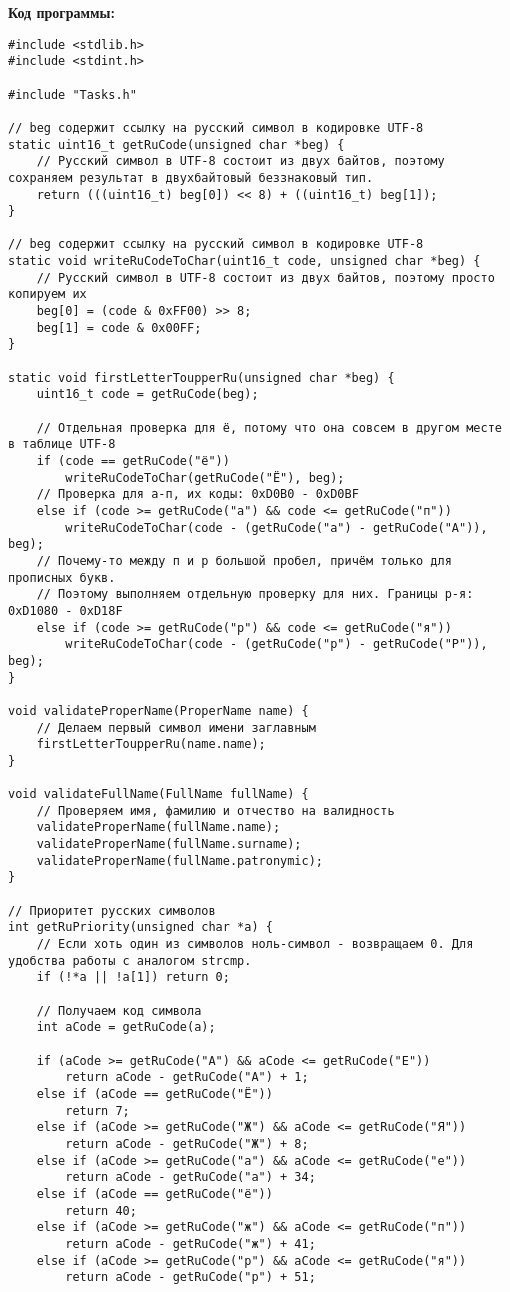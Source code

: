\documentclass[a4paper, 12pt, oneside]{article}
\begin{document}
    \textbf{Код программы:}\\
    \begin{verbatim}
#include <stdlib.h>
#include <stdint.h>

#include "Tasks.h"

// beg содержит ссылку на русский символ в кодировке UTF-8
static uint16_t getRuCode(unsigned char *beg) {
    // Русский символ в UTF-8 состоит из двух байтов, поэтому сохраняем результат в двухбайтовый беззнаковый тип.
    return (((uint16_t) beg[0]) << 8) + ((uint16_t) beg[1]);
}

// beg содержит ссылку на русский символ в кодировке UTF-8
static void writeRuCodeToChar(uint16_t code, unsigned char *beg) {
    // Русский символ в UTF-8 состоит из двух байтов, поэтому просто копируем их
    beg[0] = (code & 0xFF00) >> 8;
    beg[1] = code & 0x00FF;
}

static void firstLetterToupperRu(unsigned char *beg) {
    uint16_t code = getRuCode(beg);

    // Отдельная проверка для ё, потому что она совсем в другом месте в таблице UTF-8
    if (code == getRuCode("ё"))
        writeRuCodeToChar(getRuCode("Ë"), beg);
    // Проверка для а-п, их коды: 0xD0B0 - 0xD0BF
    else if (code >= getRuCode("а") && code <= getRuCode("п"))
        writeRuCodeToChar(code - (getRuCode("а") - getRuCode("А")), beg);
    // Почему-то между п и р большой пробел, причём только для прописных букв.
    // Поэтому выполняем отдельную проверку для них. Границы р-я: 0xD1080 - 0xD18F
    else if (code >= getRuCode("р") && code <= getRuCode("я"))
        writeRuCodeToChar(code - (getRuCode("р") - getRuCode("Р")), beg);
}

void validateProperName(ProperName name) {
    // Делаем первый символ имени заглавным
    firstLetterToupperRu(name.name);
}

void validateFullName(FullName fullName) {
    // Проверяем имя, фамилию и отчество на валидность
    validateProperName(fullName.name);
    validateProperName(fullName.surname);
    validateProperName(fullName.patronymic);
}

// Приоритет русских символов
int getRuPriority(unsigned char *a) {
    // Если хоть один из символов ноль-символ - возвращаем 0. Для удобства работы с аналогом strcmp.
    if (!*a || !a[1]) return 0;

    // Получаем код символа
    int aCode = getRuCode(a);

    if (aCode >= getRuCode("А") && aCode <= getRuCode("Е"))
        return aCode - getRuCode("А") + 1;
    else if (aCode == getRuCode("Ë"))
        return 7;
    else if (aCode >= getRuCode("Ж") && aCode <= getRuCode("Я"))
        return aCode - getRuCode("Ж") + 8;
    else if (aCode >= getRuCode("а") && aCode <= getRuCode("е"))
        return aCode - getRuCode("а") + 34;
    else if (aCode == getRuCode("ё"))
        return 40;
    else if (aCode >= getRuCode("ж") && aCode <= getRuCode("п"))
        return aCode - getRuCode("ж") + 41;
    else if (aCode >= getRuCode("р") && aCode <= getRuCode("я"))
        return aCode - getRuCode("р") + 51;


\end{verbatim}
\end{document}
